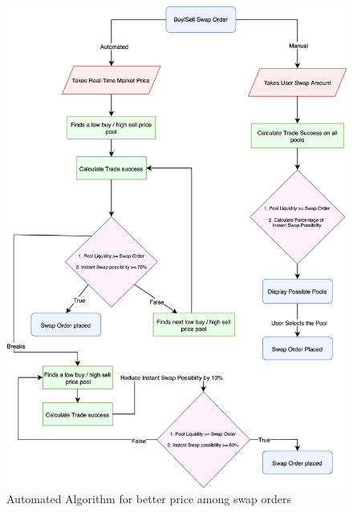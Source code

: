 \documentclass[10pt]{article}
\begin{document}
\begin{figure}[H]
\begin{center}
\includegraphics[width=14cm]{dex-algorithm}
\caption{Automated Algorithm for better price among swap orders}
\end{center}
\end{figure}
\end{document}
